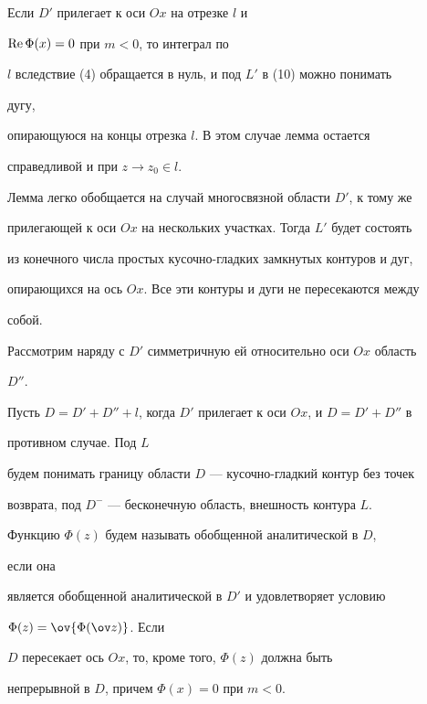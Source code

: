  


\begin{notenonum} 


Если $D'$ прилегает к оси $Ox$ на отрезке $l$ и 


$\operatorname{Re}\Phi(x)=0$ при $m<0$, то интеграл по 


$l$ вследствие (4) обращается в нуль, и под $L'$ в (10) можно понимать 


дугу, 


опирающуюся на концы отрезка $l$. В этом случае лемма остается 


справедливой и при $z\to z_0\in l$. 


\end{notenonum} 


 


Лемма легко обобщается на случай многосвязной области $D'$, к тому же 


прилегающей к оси $Ox$ на нескольких участках. Тогда $L'$ будет состоять 


из конечного числа простых кусочно-гладких замкнутых контуров и дуг, 


опирающихся на ось $Ox$. Все эти контуры и дуги не пересекаются между 


собой. 


 


Рассмотрим наряду с $D'$ симметричную ей относительно оси $Ox$ область 


$D''$. 


Пусть $D=D'+D''+l$, когда $D'$ прилегает к оси $Ox$, и $D=D'+D''$ в 


противном случае. Под $L$ 


будем понимать границу области $D$ --- кусочно-гладкий контур без точек 


возврата, под $D^-$ --- бесконечную область, внешность контура $L$. 


 


Функцию $\Phi(z)$ будем называть обобщенной аналитической в $D$, 


если она 


является обобщенной аналитической в $D'$ и удовлетворяет условию 


$\Phi(z)=\ov{\Phi(\ov z)}$. Если 


$D$ пересекает ось $Ox$, то, кроме того, $\Phi(z)$ должна быть 


непрерывной в $D$, причем $\Phi(x)=0$ при $m<0$. 


